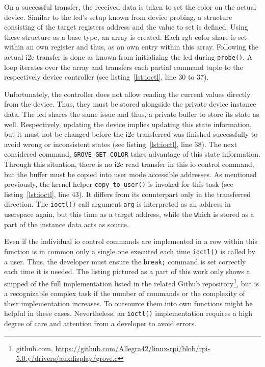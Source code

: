 On a successful transfer, the received data is taken to set the color on the actual device.
Similar to the \ac{lcd}'s setup known from device probing, a structure consisting of the target registers address and the value to set is defined.
Using these structure as a base type, an array is created.
Each \ac{rgb} color share is set within an own register and thus, as an own entry within this array.
Following the actual \ac{i2c} transfer is done as known from initializing the \ac{lcd} during \texttt{probe()}.
A loop iterates over the array and transfers each partial command tuple to the respectively device controller (see listing~\ref{lst:ioctl}, line 30 to 37).

Unfortunately, the controller does not allow reading the current values directly from the device.
Thus, they must be stored alongside the private device instance data.
The \ac{lcd} shares the same issue and thus, a private buffer to store its state as well.
Respectively, updating the device implies updating this state information, but it must not be changed before the \ac{i2c} transferred was finished successfully to avoid wrong or inconsistent states (see listing~\ref{lst:ioctl}, line 38).
The next considered command, \texttt{GROVE_GET_COLOR} takes advantage of this state information.
Through this situation, there is no \ac{i2c} read transfer in this \ac{io} control command, but the buffer must be copied into user mode accessible addresses.
As mentioned previously, the kernel helper \texttt{copy_to_user()} is invoked for this task (see listing~\ref{lst:ioctl}, line 43).
It differs from its counterpart only in the transferred direction.
The \texttt{ioctl()} call argument \texttt{arg} is interpreted as an address in userspace again, but this time as a target address, while the \texttt which is stored as a part of the instance data acts as source.

Even if the individual \ac{io} control commands are implemented in a row within this function is in common only a single one executed each time \texttt{ioctl()} is called by a user.
Thus, the developer must ensure the \texttt{break;} command is set correctly each time it is needed.
The listing pictured as a part of this work only shows a snipped of the full implementation listed in the related Github repository\footnote{github.com, \url{https://github.com/Allegra42/linux-rpi/blob/rpi-5.0.y/drivers/auxdisplay/grove.c}}, but is a recognizable complex task if the number of commands or the complexity of their implementation increases. 
To outsource them into own functions might be helpful in these cases. 
Nevertheless, an \texttt{ioctl()} implementation requires a high degree of care and attention from a developer to avoid errors.


